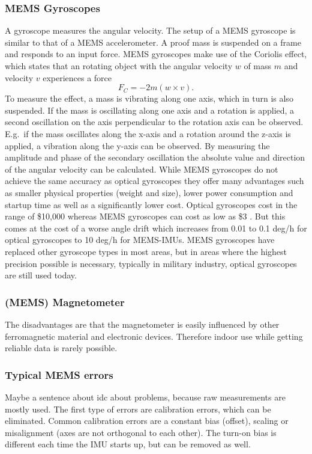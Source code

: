 \subsubsection{MEMS Gyroscopes}
A gyroscope measures the angular velocity.
The setup of a MEMS gyroscope is similar to that of a MEMS accelerometer.
A proof mass is suspended on a frame and responds to an input force.
MEMS gyroscopes make use of the Coriolis effect, which states that an rotating object with the angular velocity $w$ of mass $m$ and velocity $v$ experiences a force
\[ F_C = -2m(w\times v). \]
To measure the effect, a mass is vibrating along one axis, which in turn is also suspended.
If the mass is oscillating along one axis and a rotation is applied, a second oscillation on the axis perpendicular to the rotation axis can be observed.
E.g.\ if the mass oscillates along the x-axis and a rotation around the z-axis is applied, a vibration along the y-axis can be observed.
By measuring the amplitude and phase of the secondary oscillation the absolute value and direction of the angular velocity can be calculated.
While MEMS gyroscopes do not achieve the same accuracy as optical gyroscopes they offer many advantages such as smaller physical properties (weight and size), lower power consumption and startup time as well as a significantly lower cost.
Optical gyroscopes cost in the range of \$10,000 whereas MEMS gyroscopes can cost as low as \$3 \cite{Perlmutter2016}.
But this comes at the cost of a worse angle drift which increases from 0.01 to 0.1 deg/h  for optical gyroscopes to 10 deg/h  for MEMS-IMUs.
MEMS gyroscopes have replaced other gyroscope types in most areas, but in areas where the highest precision possible is necessary, typically in military industry, optical gyroscopes are still used today.

\subsubsection{(MEMS) Magnetometer}
The disadvantages are that the magnetometer is easily influenced by other ferromagnetic material and electronic devices.
Therefore indoor use while getting reliable data is rarely possible.

\subsubsection{Typical MEMS errors}
Maybe a sentence about idc about problems, because raw measurements are mostly used.
The first type of errors are calibration errors, which can be eliminated.
Common calibration errors are a constant bias (offset), scaling or misalignment (axes are not orthogonal to each other).
The turn-on bias is different each time the IMU starts up, but can be removed as well.


